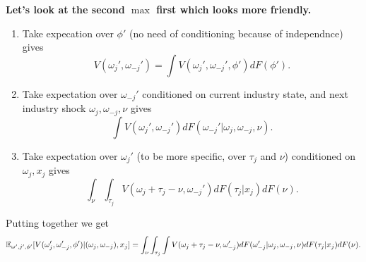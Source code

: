 \documentclass[12pt]{article}[margin=1in]
\begin{document}
\textbf{Let's look at the second $\max$ first which looks more friendly.}

\begin{enumerate}
    \item Take expecation over $\phi'$ (no need of conditioning because of independnce) gives $$V(\omega_j',\omega_{-j}')=\int V(\omega_j', \omega_{-j}', \phi')dF(\phi').$$
    \item Take expectation over $\omega_{-j}'$ conditioned on current industry state, and next industry shock $\omega_j,\omega_{-j},\nu$ gives $$\int V(\omega_j', \omega_{-j}')dF(\omega_{-j}'|\omega_j,\omega_{-j},\nu).$$
    \item Take expectation over $\omega_j'$ (to be more specific, over $\tau_j$ and $\nu$) conditioned on $\omega_j,x_j$ gives $$\int_\nu \int_{\tau_j} V(\omega_j+\tau_j-\nu, \omega_{-j}')dF(\tau_j|x_j)dF(\nu).$$
\end{enumerate}

Putting together we get 
\begin{equation*}
    \mathbb{E}_{\omega',j',\phi'}[V(\omega_j',\omega_{-j}',\phi')|(\omega_j, \omega_{-j}),x_j]=\int_\nu \int_{\tau_j} \int V(\omega_j+\tau_j-\nu, \omega_{-j}')dF(\omega_{-j}'|\omega_j,\omega_{-j},\nu)dF(\tau_j|x_j)dF(\nu).
\end{equation*}
\end{document}
